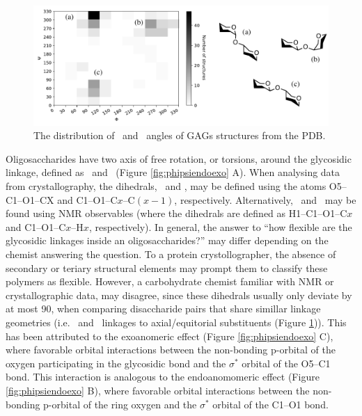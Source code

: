 \documentclass[journal=jctcce,manuscript=article]{achemso}
\begin{document}
{\begin{figure}[tl!]
    \centering
    \includegraphics[width=14cm]{phi_psi_distributions.pdf}
    \caption{The distribution of \textphi~and \textpsi~angles of \acp{GAG} structures from the \acf{PDB}.}
    \label{fig:phi_psi_dist}
\end{figure}

Oligosaccharides have two axis of free rotation, or torsions, around the glycosidic linkage, defined as \textphi~and \textphi~(Figure \ref{fig:phipsiendoexo} A). When analysing data from crystallography, the dihedrals, \textphi~and \textphi, may be defined using the atoms O5--C1--O1--CX and C1--O1--C$x$--C$(x-1)$, respectively.
Alternatively, \textphi~and \textphi~may be found using NMR observables (where the dihedrals are defined as H1--C1--O1--C$x$ and C1--O1--C$x$--H$x$, respectively). 
In general, the answer to ``how flexible are the glycosidic linkages inside an oligosaccharides?'' may differ depending on the chemist answering the question. To a protein crystollographer, the absence of secondary or teriary structural elements may prompt them to classify these polymers as flexible. However, a carbohydrate chemist familiar with NMR or crystallographic data, may disagree, since these dihedrals usually only deviate by at most 90\textdegree, when comparing disaccharide pairs that share simillar linkage geometries (i.e. \textalpha~and \textbeta~linkages to axial/equitorial substituents (Figure \ref{fig:phi_psi_dist})). This has been attributed to the exoanomeric effect (Figure \ref{fig:phipsiendoexo} C), where favorable orbital interactions between the non-bonding p-orbital of the oxygen participating in the glycosidic bond and the $\sigma^{*}$ orbital of the O5--C1 bond. This interaction is analogous to the endoanomomeric effect (Figure \ref{fig:phipsiendoexo} B), where favorable orbital interactions between the non-bonding p-orbital of the ring oxygen and the $\sigma^{*}$ orbital of the C1--O1 bond.






}
\end{document}
